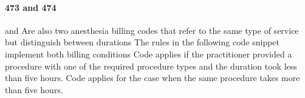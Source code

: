 \paragraph{473 and 474}
and
Are also two anesthesia billing codes that refer to the same type of service but distinguish between durations
The rules in the following code snippet implement both billing conditions
Code  applies if the practitioner provided a  procedure with one of the required procedure types and the duration took less than five hours.
Code  applies for the case when the same procedure takes more than five hours.



